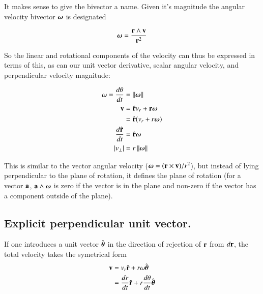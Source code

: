 \documentclass{article}      %
\newcommand{\dt}[1]{\frac{d {#1}}{dt}}
\newcommand{\Norm}[1]{\left\lVert{#1}\right\rVert}
\begin{document}
It makes sense to give the bivector a name.  Given it's magnitude the 
angular velocity bivector $\boldsymbol{\omega}$ is designated

\[
\boldsymbol{\omega} = \frac{ \mathbf{r} \wedge \mathbf{v} }{\mathbf{r}^2} 
\]

So the linear and rotational components of the velocity can thus be expressed in terms of this, as can our
unit vector derivative, scalar angular velocity, and perpendicular velocity magnitude:

\begin{align*}
\omega = \dt{\theta} &= \Norm{ \Bomega } \\
\Bv &= \rcap v_r + \Br \Bomega \\
    &= \rcap( v_r + r \Bomega ) \\
\dt{\rcap} &= \rcap \Bomega \\
\abs{v_{\perp}} &= r \Norm{ \Bomega } \\
\end{align*}

This is similar to the vector angular velocity ($\boldsymbol{\omega} = (\mathbf{r} \times \mathbf{v})/r^2$), but instead of lying perpendicular to the
plane of rotation, it defines the plane of rotation (for a vector $\mathbf{a}$, $\mathbf{a} \wedge \boldsymbol{\omega}$ is zero if the vector is in the plane and non-zero if the vector has a component outside of the plane).

%
%
%

\subsection{Explicit perpendicular unit vector.}

If one introduces a unit vector $\hat{\boldsymbol{\theta}}$ in the direction of rejection of $\mathbf{r}$ from $d\mathbf{r}$, the total velocity takes the symetrical form
\begin{align*}
\Bv 
   &= v_r\rcap + r\omega\thetacap \\
   &= \dt{r}\rcap + r\dt{\theta}\thetacap \\
\end{align*}
\end{document}
